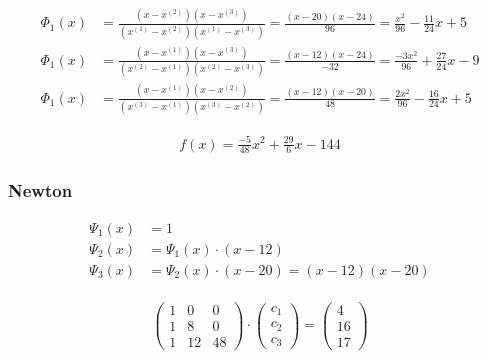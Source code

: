 \begin{equation}
	\begin{aligned}
		\Phi_1(x) &= \frac{(x-x^{(2)})(x-x^{(3)})}{(x^{(1)}-x^{(2)})(x^{(1)}-x^{(3)})} = \frac{(x-20)(x-24)}{96} = \frac{x^2}{96} - \frac{11}{24}x+5\\
		\Phi_1(x) &= \frac{(x-x^{(1)})(x-x^{(3)})}{(x^{(2)}-x^{(1)})(x^{(2)}-x^{(3)})} = \frac{(x-12)(x-24)}{-32} = \frac{-3x^2}{96} + \frac{27}{24}x - 9\\
		\Phi_1(x) &= \frac{(x-x^{(1)})(x-x^{(2)})}{(x^{(3)}-x^{(1)})(x^{(3)}-x^{(2)})} = \frac{(x-12)(x-20)}{48} = \frac{2x^2}{96} - \frac{16}{24}x + 5
	\end{aligned}
\end{equation}


\begin{equation}
	\begin{aligned}
		f(x) = \frac{-5}{48}x^2 + \frac{29}{6}x-144
	\end{aligned}
\end{equation}

\subsubsection{Newton}

\begin{equation}
	\begin{aligned}
		\Psi_1(x) &= 1\\
		\Psi_2(x) &= \Psi_1(x) \cdot (x-12)\\
		\Psi_3(x) &= \Psi_2(x) \cdot (x-20) = (x-12)(x-20)\\
	\end{aligned}
\end{equation}

\begin{equation}
	\begin{pmatrix}
		1 & 0 & 0\\
		1 & 8 & 0\\
		1 & 12 & 48
	\end{pmatrix}\cdot
	\begin{pmatrix}
		c_1\\
		c_2\\
		c_3
	\end{pmatrix}=
	\begin{pmatrix}
		4\\
		16\\
		17
	\end{pmatrix}
\end{equation}

